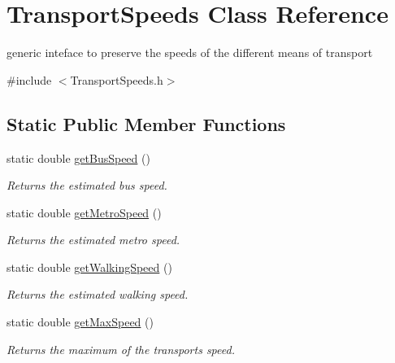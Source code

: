 \hypertarget{class_transport_speeds}{}\section{Transport\+Speeds Class Reference}
\label{class_transport_speeds}


generic inteface to preserve the speeds of the different means of transport  




{\ttfamily \#include $<$Transport\+Speeds.\+h$>$}

\subsection*{Static Public Member Functions}
\begin{DoxyCompactItemize}
\item 
\hypertarget{class_transport_speeds_adca751db60110762034338c76008801b}{}static double \hyperlink{class_transport_speeds_adca751db60110762034338c76008801b}{get\+Bus\+Speed} ()\label{class_transport_speeds_adca751db60110762034338c76008801b}

\begin{DoxyCompactList}\small\item\em Returns the estimated bus speed. \end{DoxyCompactList}\item 
\hypertarget{class_transport_speeds_a2d1b4983bdd67d6282a0439eaef4f5f6}{}static double \hyperlink{class_transport_speeds_a2d1b4983bdd67d6282a0439eaef4f5f6}{get\+Metro\+Speed} ()\label{class_transport_speeds_a2d1b4983bdd67d6282a0439eaef4f5f6}

\begin{DoxyCompactList}\small\item\em Returns the estimated metro speed. \end{DoxyCompactList}\item 
\hypertarget{class_transport_speeds_ae79691cf1d4716bbf301ebab34c2063a}{}static double \hyperlink{class_transport_speeds_ae79691cf1d4716bbf301ebab34c2063a}{get\+Walking\+Speed} ()\label{class_transport_speeds_ae79691cf1d4716bbf301ebab34c2063a}

\begin{DoxyCompactList}\small\item\em Returns the estimated walking speed. \end{DoxyCompactList}\item 
\hypertarget{class_transport_speeds_a799464f9b86baf4d742aceefd14bf0fb}{}static double \hyperlink{class_transport_speeds_a799464f9b86baf4d742aceefd14bf0fb}{get\+Max\+Speed} ()\label{class_transport_speeds_a799464f9b86baf4d742aceefd14bf0fb}

\begin{DoxyCompactList}\small\item\em Returns the maximum of the transport\textquotesingle{}s speed. \end{DoxyCompactList}\end{DoxyCompactItemize}


